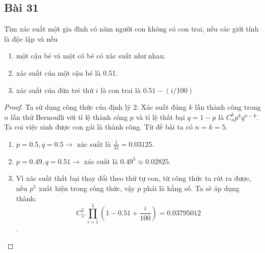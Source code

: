 \subsection*{Bài 31}
Tìm xác suất một gia đình có năm người con không có con trai, nếu các giới tính là độc lập và nếu \begin{enumerate}[label=\alph*)]
    \item một cậu bé và một cô bé có xác suất như nhau.
    \item xác suất của một cậu bé là 0.51.
    \item xác suất của đứa trẻ thứ $i$ là con trai là $0.51-(i/100)$
\end{enumerate}
\begin{proof}
    Ta sử dụng công thức của định lý 2: Xác suất đúng $k$ lần thành công trong $n$ lần thử Bernoulli với tỉ lệ thành công $p$ và tỉ lệ thất bại $q=1-p$ là $C^k_np^kq^{n-k}$. Ta coi việc sinh được con gái là thành công. Từ đề bài ta có $n=k=5$.
    \begin{enumerate}[label=\alph*)]
        \item $p=0.5,q=0.5\rightarrow$ xác suất là $\frac{1}{32}=0.03125$.
        \item $p=0.49,q=0.51\rightarrow$ xác suất là $0.49^5\approx0.02825$.
        \item Vì xác suất thất bại thay đổi theo thứ tự con, từ công thức ta rút ra được, nếu $p^5$ xuất hiện trong công thức, vậy $p$ phải là hằng số. Ta sẽ áp dụng thành: $$C^5_5.\prod_{i=1}^5(1-0.51+\frac{i}{100})=0.03795012$$.
    \end{enumerate}
\end{proof}